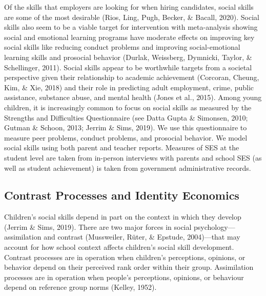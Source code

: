 \documentclass[
  english,
  man]{apa6}
\begin{document}
Of the skills that employers are looking for when hiring candidates, social skills are some of the most desirable (Rios, Ling, Pugh, Becker, \& Bacall, 2020). Social skills also seem to be a viable target for intervention with meta-analysis showing social and emotional learning programs have moderate effects on improving key social skills like reducing conduct problems and improving social-emotional learning skills and prosocial behavior (Durlak, Weissberg, Dymnicki, Taylor, \& Schellinger, 2011). Social skills appear to be worthwhile targets from a societal perspective given their relationship to academic achievement (Corcoran, Cheung, Kim, \& Xie, 2018) and their role in predicting adult employment, crime, public assistance, substance abuse, and mental health (Jones et al., 2015). Among young children, it is increasingly common to focus on social skills as measured by the Strengths and Difficulties Questionnaire (see Datta Gupta \& Simonsen, 2010; Gutman \& Schoon, 2013; Jerrim \& Sims, 2019). We use this questionnaire to measure peer problems, conduct problems, and prosocial behavior. We model social skills using both parent and teacher reports. Measures of SES at the student level are taken from in-person interviews with parents and school SES (as well as student achievement) is taken from government administrative records.

\hypertarget{contrast-processes-and-identity-economics}{%
\subsection{Contrast Processes and Identity Economics}\label{contrast-processes-and-identity-economics}}

Children's social skills depend in part on the context in which they develop (Jerrim \& Sims, 2019). There are two major forces in social psychology---assimilation and contrast (Mussweiler, Rüter, \& Epstude, 2004)---that may account for how school context affects children's social skill development. Contrast processes are in operation when children's perceptions, opinions, or behavior depend on their perceived rank order within their group. Assimilation processes are in operation when people's perceptions, opinions, or behaviour depend on reference group norms (Kelley, 1952).
\end{document}
